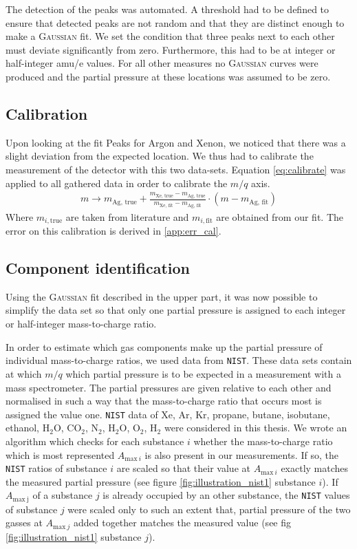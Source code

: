 The detection of the peaks was automated. A threshold had to be defined to ensure that detected peaks are not random and that they are distinct enough to make a {\scshape Gaussian} fit. We set the condition that three peaks next to each other must deviate significantly from zero. Furthermore, this had to be at integer or half-integer amu/e values. 
For all other measures no {\scshape Gaussian} curves were produced and the partial pressure at these locations was assumed to be zero.

\subsection{Calibration}
Upon looking at the fit Peaks for Argon and Xenon, we noticed that there was a slight deviation from the expected location. We thus had to calibrate the measurement of the detector with this two data-sets. Equation \eqref{eq:calibrate} was applied to all gathered data in order to calibrate the $m/q$ axis.
\begin{align}
    m \to m_\text{Ag, true} + \frac{m_\text{Xe, true} - m_\text{Ag, true}}{m_\text{Xe, fit} - m_\text{Ag, fit}} \cdot (m - m_\text{Ag, fit}) \label{eq:calibrate}
\end{align}
Where $m_{i, \text{true}}$ are taken from literature and $m_{i, \text{fit}}$ are obtained from our fit.
The error on this calibration is derived in \ref{app:err_cal}.

\subsection{Component identification}

Using the {\scshape Gaussian} fit described in the upper part, it was now possible to simplify the data set so that only one partial pressure is assigned to each integer or half-integer mass-to-charge ratio. 

In order to estimate which gas components make up the partial pressure of individual mass-to-charge ratios, we used data from \texttt{NIST}. These data sets contain at which $m/q$ which partial pressure is to be expected in a measurement with a mass spectrometer. The partial pressures are given relative to each other and normalised in such a way that the mass-to-charge ratio that occurs most is assigned the value one. \texttt{NIST} data of Xe, Ar, Kr, propane, butane, isobutane, ethanol, H$_2$O, CO$_2$, N$_2$, H$_2$O, O$_2$, H$_2$ were considered in this thesis. We wrote an algorithm which checks for each substance $i$ whether the mass-to-charge ratio which is most represented $A_{\mathrm{max}~i}$ is also present in our measurements. If so, the \texttt{NIST} ratios of substance $i$ are scaled so that their value at $A_{\mathrm{max}~i}$ exactly matches the measured partial pressure (see figure \ref{fig:illustration_nist1} substance $i$). If $A_{\mathrm{max~j}}$ of a substance $j$ is already occupied by an other substance, the \texttt{NIST} values of substance $j$ were scaled only to such an extent that, partial pressure of the two gasses at $A_{\mathrm{max}~j}$ added together matches the measured value (see fig \ref{fig:illustration_nist1} substance $j$).  

